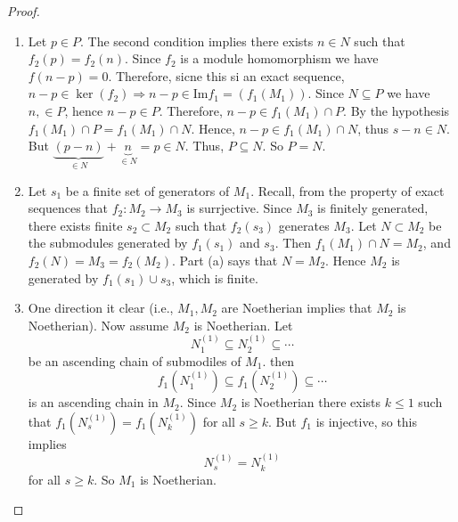 \documentclass[twoside, openright, fontsize=10pt, headings=big]{scrbook}
\begin{document}
\begin{proof}
    \begin{enumerate}[label=(\alph*)]
        \item Let $p\in P$. The second condition implies there exists $n\in N$ such that $f_2(p)=f_2(n)$. Since $f_2$ is a module homomorphism we have $f(n-p)=0$. Therefore, sicne this si an exact sequence, $n-p\in\ker(f_2)\Rightarrow n-p\in$Im$f_1=(f_1(M_1))$. Since $N\subseteq P$ we have $n,\in P$, hence $n-p\in P$. Therefore, $n-p\in f_1(M_1)\cap P$. By the hypothesis $f_1(M_1)\cap P=f_1(M_1)\cap N$. Hence, $n-p\in f_1(M_1)\cap N$, thus $s-n\in N$. But $\underbrace{(p-n)}_{\in N}+\underbrace{n}_{\in N}=p\in N$. Thus, $P\subseteq N$. So $P=N$.
        \item Let $s_1$ be a finite set of generators of $M_1$. Recall, from the property of exact sequences that $f_2:M_2\to M_3$ is surrjective. Since $M_3$ is finitely generated, there exists finite $s_2\subset M_2$ such that $f_2(s_3)$ generates $M_3$. Let $N\subset M_2$ be the submodules generated by $f_1(s_1)$ and $s_3$. Then $f_1(M_1)\cap N=M_2$, and $f_2(N)=M_3=f_2(M_2)$. Part (a) says that $N=M_2$. Hence $M_2$ is generated by $f_1(s_1)\cup s_3$, which is finite.
        \item One direction it clear (i.e., $M_1,M_2$ are Noetherian implies that $M_2$ is Noetherian). Now assume $M_2$ is Noetherian. Let
        \[
            N_1^{(1)}\subseteq N_2^{(1)}\subseteq\cdots
        \]
        be an ascending chain of submodiles of $M_1$. then
        \[
            f_1(N_1^{(1)})\subseteq f_1(N_2^{(1)})\subseteq\cdots 
        \]
        is an ascending chain in $M_2$. Since $M_2$ is Noetherian there exists $k\leq 1$ such that $f_1(N_s^{(1)})=f_1(N_k^{(1)})$ for all $s\geq k$. But $f_1$ is injective, so this implies 
        \[
            N_s^{(1)}=N_k^{(1)}
        \]
        for all $s\geq k$. So $M_1$ is Noetherian.\qedhere
    \end{enumerate}
\end{proof}
\end{document}
